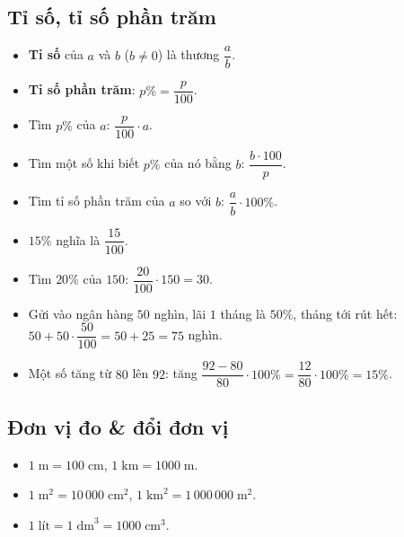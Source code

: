 \documentclass[12pt,a4paper]{article}
\begin{document}
\subsection{Tỉ số, tỉ số phần trăm}

\begin{dinhnghia}
\begin{itemize}
  \item \textbf{Tỉ số} của $a$ và $b$ ($b \ne 0$) là thương $\dfrac{a}{b}$.
  \item \textbf{Tỉ số phần trăm}: $p\% = \dfrac{p}{100}$.
\end{itemize}
\end{dinhnghia}

\begin{congthuc}[title={Bài toán phần trăm cơ bản}]
\begin{itemize}
  \item Tìm $p\%$ của $a$: $\dfrac{p}{100} \cdot a$.
  \item Tìm một số khi biết $p\%$ của nó bằng $b$: $\dfrac{b \cdot 100}{p}$.
  \item Tìm tỉ số phần trăm của $a$ so với $b$: $\dfrac{a}{b} \cdot 100\%$.
\end{itemize}
\end{congthuc}

\begin{vidu}
\begin{itemize}
  \item $15\%$ nghĩa là $\dfrac{15}{100}$.
  \item Tìm $20\%$ của $150$: $\dfrac{20}{100} \cdot 150 = 30$.
  \item Gửi vào ngân hàng $50$ nghìn, lãi $1$ tháng là $50\%$, tháng tới rút hết: $50 + 50 \cdot \dfrac{50}{100} = 50 + 25 = 75$ nghìn.
  \item Một số tăng từ $80$ lên $92$: tăng $\dfrac{92 - 80}{80} \cdot 100\% = \dfrac{12}{80} \cdot 100\% = 15\%$.
\end{itemize}
\end{vidu}

\subsection{Đơn vị đo \& đổi đơn vị}

\begin{congthuc}[title={Một số quan hệ đổi đơn vị}]
\begin{itemize}
  \item $1\;\text{m} = 100\;\text{cm}$, \quad $1\;\text{km} = 1000\;\text{m}$.
  \item $1\;\text{m}^2 = 10\,000\;\text{cm}^2$, \quad $1\;\text{km}^2 = 1\,000\,000\;\text{m}^2$.
  \item $1\;\text{lít} = 1\;\text{dm}^3 = 1000\;\text{cm}^3$.
\end{itemize}
\end{congthuc}
\end{document}
